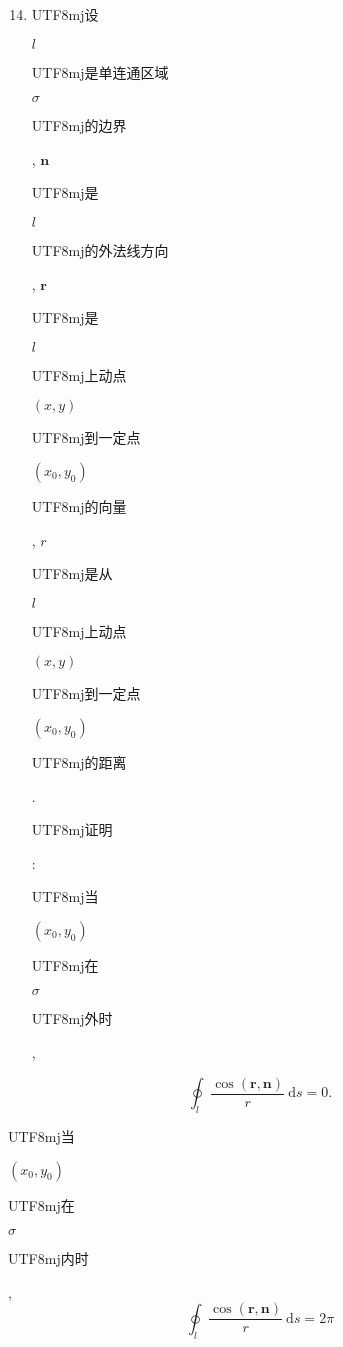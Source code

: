 \documentclass[10pt]{article}
\begin{document}
\begin{enumerate}
  \setcounter{enumi}{13}
  \item \begin{CJK}{UTF8}{mj}设\end{CJK} $l$ \begin{CJK}{UTF8}{mj}是单连通区域\end{CJK} $\sigma$ \begin{CJK}{UTF8}{mj}的边界\end{CJK}, $\mathbf{n}$ \begin{CJK}{UTF8}{mj}是\end{CJK} $l$ \begin{CJK}{UTF8}{mj}的外法线方向\end{CJK}, $\mathbf{r}$ \begin{CJK}{UTF8}{mj}是\end{CJK} $l$ \begin{CJK}{UTF8}{mj}上动点\end{CJK} $(x, y)$ \begin{CJK}{UTF8}{mj}到一定点\end{CJK} $\left(x_{0}, y_{0}\right)$ \begin{CJK}{UTF8}{mj}的向量\end{CJK}, $r$ \begin{CJK}{UTF8}{mj}是从\end{CJK} $l$ \begin{CJK}{UTF8}{mj}上动点\end{CJK} $(x, y)$ \begin{CJK}{UTF8}{mj}到一定点\end{CJK} $\left(x_{0}, y_{0}\right)$ \begin{CJK}{UTF8}{mj}的距离\end{CJK}. \begin{CJK}{UTF8}{mj}证明\end{CJK}: \begin{CJK}{UTF8}{mj}当\end{CJK} $\left(x_{0}, y_{0}\right)$ \begin{CJK}{UTF8}{mj}在\end{CJK} $\sigma$ \begin{CJK}{UTF8}{mj}外时\end{CJK},
\end{enumerate}
$$
\oint_{l} \frac{\cos (\mathbf{r}, \mathbf{n})}{r} \mathrm{~d} s=0 .
$$
\begin{CJK}{UTF8}{mj}当\end{CJK} $\left(x_{0}, y_{0}\right)$ \begin{CJK}{UTF8}{mj}在\end{CJK} $\sigma$ \begin{CJK}{UTF8}{mj}内时\end{CJK},
$$
\oint_{l} \frac{\cos (\mathbf{r}, \mathbf{n})}{r} \mathrm{~d} s=2 \pi
$$
\end{document}
